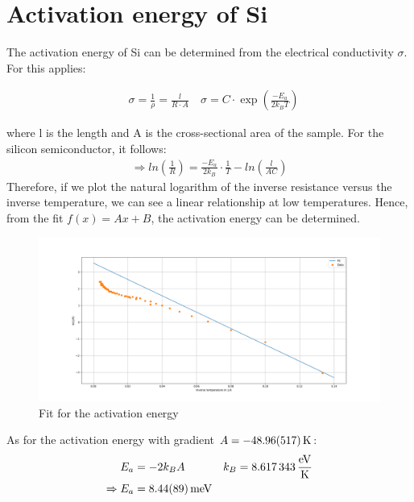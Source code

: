 
\section{Activation energy of Si}
The activation energy of Si can be determined from the electrical conductivity $\sigma$. For this applies:

\begin{align}
    &\sigma = \frac{1}{\rho} = \frac{l}{R\cdot A} \
    &\sigma = C\cdot \exp \left (\frac{-E_a}{2k_BT} \right ) 
\end{align}

where l is the length and A is the cross-sectional area of the sample. For the silicon semiconductor, it follows:
\begin{align}
    \Rightarrow ln\left( \frac{1}{R}\right ) = \frac{-E_a}{2k_B} \cdot \frac{1}{T} -ln \left ( \frac{l}{AC} \right )
\end{align}
Therefore, if we plot the natural logarithm of the inverse resistance versus the inverse temperature, we can see a linear relationship at low temperatures. Hence, from the fit $f(x) = Ax+B $, the activation energy can be determined. 
\begin{figure}
    \centering
    \includegraphics[width=1.0\textwidth]{./fig/ex4.png}
    \caption{Fit for the activation energy}
    \label{fig:E_activation}
\end{figure}
As for the activation energy with gradient $A = \SI{-48,96\pm5,17}{K}$:
\begin{align}
    E_a &= -2k_BA &k_B = \SI{8,617343}{\frac{eV}{K}} \\
    \Rightarrow E_a &= \SI{8,44\pm 0,89}{meV}
\end{align}